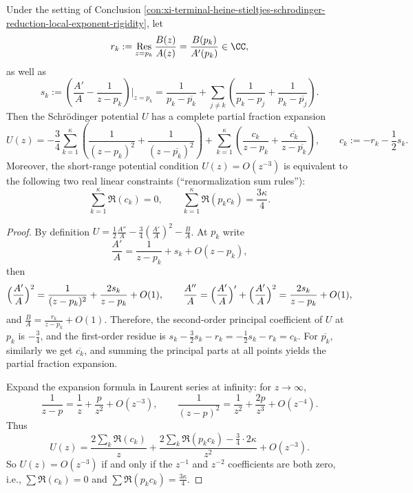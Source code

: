 \begin{conclusion}\label{con:xi-terminal-heine-stieltjes-pole-expansion-renormalization-sum-rules}
Under the setting of Conclusion \ref{con:xi-terminal-heine-stieltjes-schrodinger-reduction-local-exponent-rigidity}, let
\[
r_k:=\operatorname*{Res}_{z=p_k}\frac{B(z)}{A(z)}=\frac{B(p_k)}{A'(p_k)}\in\CC,
\]
as well as
\[
s_k:=\left(\frac{A'}{A}-\frac{1}{z-p_k}\right)\Big|_{z=p_k}
=\frac{1}{p_k-\overline{p_k}}+\sum_{j\ne k}\left(\frac{1}{p_k-p_j}+\frac{1}{p_k-\overline{p_j}}\right).
\]
Then the Schr\"odinger potential \(U\) has a complete partial fraction expansion
\[
U(z)=
-\frac34\sum_{k=1}^{\kappa}\left(\frac{1}{(z-p_k)^2}+\frac{1}{(z-\overline{p_k})^2}\right)
+\sum_{k=1}^{\kappa}\left(\frac{c_k}{z-p_k}+\frac{\overline{c_k}}{z-\overline{p_k}}\right),
\qquad
c_k:=-r_k-\frac12 s_k.
\]
Moreover, the short-range potential condition \(U(z)=O(z^{-3})\) is equivalent to the following two real linear constraints (``renormalization sum rules''):
\[
\sum_{k=1}^{\kappa}\Re(c_k)=0,
\qquad
\sum_{k=1}^{\kappa}\Re(p_k c_k)=\frac{3\kappa}{4}.
\]
\end{conclusion}
\begin{proof}
By definition
\(
U=\frac12\frac{A''}{A}-\frac34(\frac{A'}{A})^2-\frac{B}{A}
\).
At \(p_k\) write
\[
\frac{A'}{A}=\frac{1}{z-p_k}+s_k+O(z-p_k),
\]
then
\[
\Bigl(\frac{A'}{A}\Bigr)^2=\frac{1}{(z-p_k)^2}+\frac{2s_k}{z-p_k}+O(1),
\qquad
\frac{A''}{A}=\Bigl(\frac{A'}{A}\Bigr)'+\Bigl(\frac{A'}{A}\Bigr)^2=\frac{2s_k}{z-p_k}+O(1),
\]
and
\(
\frac{B}{A}=\frac{r_k}{z-p_k}+O(1)
\).
Therefore, the second-order principal coefficient of \(U\) at \(p_k\) is \(-\tfrac34\), and the first-order residue is
\(
s_k-\tfrac32 s_k-r_k=-\tfrac12 s_k-r_k=c_k
\).
For \(\overline{p_k}\), similarly we get \(\overline{c_k}\), and summing the principal parts at all points yields the partial fraction expansion.
\par
Expand the expansion formula in Laurent series at infinity: for \(z\to\infty\),
\[
\frac{1}{z-p}=\frac{1}{z}+\frac{p}{z^{2}}+O(z^{-3}),
\qquad
\frac{1}{(z-p)^2}=\frac{1}{z^{2}}+\frac{2p}{z^{3}}+O(z^{-4}).
\]
Thus
\[
U(z)=\frac{2\sum_k \Re(c_k)}{z}
+\frac{2\sum_k\Re(p_k c_k)-\frac34\cdot 2\kappa}{z^{2}}
+O(z^{-3}).
\]
So \(U(z)=O(z^{-3})\) if and only if the \(z^{-1}\) and \(z^{-2}\) coefficients are both zero, i.e.,
\(
\sum\Re(c_k)=0
\)
and
\(
\sum\Re(p_k c_k)=\tfrac{3\kappa}{4}
\).
\end{proof}

